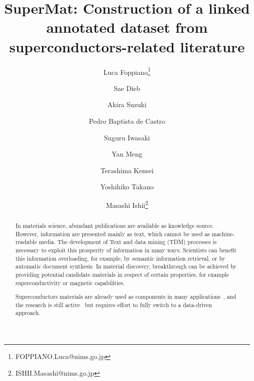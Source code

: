 \documentclass[a4paper,10pt]{article}
\title{SuperMat: Construction of a linked annotated dataset from superconductors-related literature}
\author[1]{Luca Foppiano\thanks{FOPPIANO.Luca@nims.go.jp}}
\author[1]{Sae Dieb}
\author[1]{Akira Suzuki}
\author[2]{Pedro Baptista de Castro}
\author[2]{Suguru Iwasaki}
\author[2]{Yan Meng}
\author[2]{Terashima Kensei}
\author[2]{Yoshihiko Takano}
\author[1]{Masashi Ishii\thanks{ISHII.Masashi@nims.go.jp}}
\affil[1]{Material Database Group, MaDIS, NIMS, Japan}
\affil[2]{Nano Frontier Superconducting Materials Group, MANA, NIMS}
\begin{document}
\maketitle

\begin{abstract}





In materials science, abundant publications are available as knowledge source. However, information are presented mainly as text, which cannot be used as machine-readable media.
The development of Text and data mining (TDM) processes is necessary to exploit this prosperity of information in many ways. Scientists can benefit this information overloading, for example, by semantic information retrieval, or by automatic document synthesis. 
In material discovery, breakthrough can be achieved by providing potential candidate materials in respect of certain properties, for example superconductivity or magnetic capabilities. 

Superconductors materials are already used as components in many applications~\cite{Hoshino2015InnovativeLR, Kizu2010ConstructionOT, Cardani2017NewAO, THOMAS201659},  and the research is still active~\cite{Drozdov_2019} but requires effort to fully switch to a data-driven approach\cite{Hamlin2019SuperconductivityNR}. 


\end{abstract}
\end{document}
